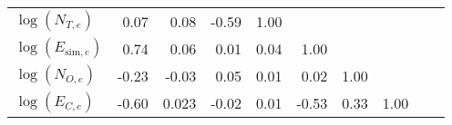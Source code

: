 \documentclass[unnumsec,webpdf,contemporary,large]{oup-authoring-template}%
\theoremstyle{thmstyleone}%
\theoremstyle{thmstyletwo}%
\theoremstyle{thmstylethree}%
\begin{document}
\begin{table}[!ht]
\begin{tabular}{l|rrrrrrrrr|}
$\log(N_{T,e})$            & \hspace{0.29cm}0.07                                    & \hspace{0.29cm}0.08                                 & -0.59                                                 & \hspace{0.29cm}1.00                                 &                                                                &                                                     &                                                     &                                                     &                                                        \\
$\log(E_{\textrm{sim},e})$ & \hspace{0.29cm}0.74                                    & \hspace{0.29cm}0.06                                 & \hspace{0.29cm}0.01                                   & \hspace{0.29cm}0.04                                 & \hspace{0.29cm}1.00                                            &                                                     &                                                     &                                                     &                                                        \\
$\log(N_{O,e})$            & -0.23                                                  & -0.03                                               & \hspace{0.29cm}0.05                                   & \hspace{0.29cm}0.01                                 & \hspace{0.29cm}0.02                                            & \hspace{0.29cm}1.00                                 &                                                     &                                                     &                                                        \\
$\log(E_{C,e})$            & -0.60                                                  & \hspace{0.29cm}0.023                                & -0.02                                                 & \hspace{0.29cm}0.01                                 & -0.53                                                          & \hspace{0.29cm}0.33                                 & \hspace{0.29cm}1.00                                 &                                                     &                                                        \\

\end{tabular}
\end{table}
\end{document}
